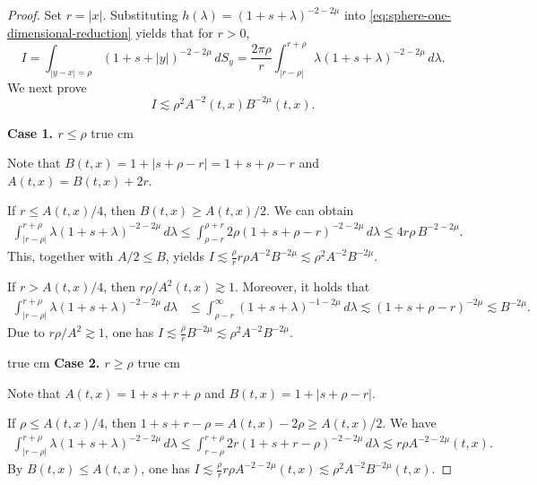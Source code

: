 \documentclass[11pt,twoside]{article}
\def\ls{\lesssim}
\theoremstyle{plain}
\theoremstyle{definition}
\theoremstyle{assumption}
\numberwithin{equation}{section}
\begin{document}
	\begin{proof}
		Set \(r=|x|\). Substituting $h(\lambda)=(1+s+\lambda)^{-2-2\mu}$ into
		\eqref{eq:sphere-one-dimensional-reduction} yields that for $r>0$,
		\begin{equation}\label{eq:I-definition}
			I=
			\int_{|y-x|=\rho}
			(1+s+|y|)^{-2-2\mu}\,dS_y
			=
			\frac{2\pi\rho}{r}
			\int_{|r-\rho|}^{r+\rho}
			\lambda(1+s+\lambda)^{-2-2\mu}\,d\lambda .
		\end{equation}
		We next prove
		\begin{equation}\label{eq:I-goal}
			I\ls \rho^2 A^{-2}(t,x)B^{-2\mu}(t,x).
		\end{equation}
		
			
		\smallskip
		\noindent
		\textbf{Case 1. $r\le \rho$}
 true cm

		Note that $B(t,x)=1+|s+\rho-r|=1+s+\rho-r$
		and $A(t,x)=B(t,x)+2r$.
		
		If $r\le A(t,x)/4$, then $B(t,x)\ge A(t,x)/2$. We can obtain
		\begin{equation*}
			\begin{aligned}
				\int_{|r-\rho|}^{r+\rho} \lambda(1+s+\lambda)^{-2-2\mu}\,d\lambda
				\le
				\int_{\rho-r}^{\rho+r} 2\rho(1+s+\rho-r)^{-2-2\mu}\,d\lambda
				\le
				4 r\rho\,B^{-2-2\mu}.
			\end{aligned}
		\end{equation*}
		This, together with $A/2 \le B$, yields
		$I\ls \frac{\rho}{r} r\rho A^{-2}B^{-2\mu}
			\ls \rho^2 A^{-2}B^{-2\mu}$.
		
		
		If $r>A(t,x)/4$, then $r\rho/A^2(t,x)\gtrsim 1$. Moreover, it holds that
		\begin{equation*}
			\begin{aligned}
				\int_{|r-\rho|}^{r+\rho} \lambda(1+s+\lambda)^{-2-2\mu}\,d\lambda
				&\le
				\int_{\rho-r}^\infty (1+s+\lambda)^{-1-2\mu}\,d\lambda  \ls
				(1+s+\rho-r)^{-2\mu}
				\ls
				B^{-2\mu}.
			\end{aligned}
		\end{equation*}
		Due to $r\rho/A^2\gtrsim1$, one has
		$I\ls \frac{\rho}{r}B^{-2\mu}
			\ls \rho^2 A^{-2}B^{-2\mu}$.
				
		
		 true cm
		\noindent
		\textbf{Case 2. $r\ge \rho$}
 true cm

		Note that $A(t,x)=1+s+r+\rho$ and $B(t,x)=1+|s+\rho-r|$.
		
		
		If $\rho\le A(t,x)/4$, then $1+s+r-\rho=A(t,x)-2\rho\ge A(t,x)/2$. We have
		\begin{equation*}
			\begin{aligned}
				\int_{|r-\rho|}^{r+\rho} \lambda(1+s+\lambda)^{-2-2\mu}\,d\lambda
				\le
				\int_{r-\rho}^{r+\rho} 2r(1+s+r-\rho)^{-2-2\mu}\,d\lambda
				\ls
				r\rho A^{-2-2\mu}(t,x).
			\end{aligned}
		\end{equation*}
		By $B(t,x)\le A(t,x)$, one has
		$I\ls \frac{\rho}{r} r\rho A^{-2-2\mu}(t,x)
			\ls \rho^2 A^{-2}B^{-2\mu}(t,x)$.
		

\end{proof}
\end{document}

